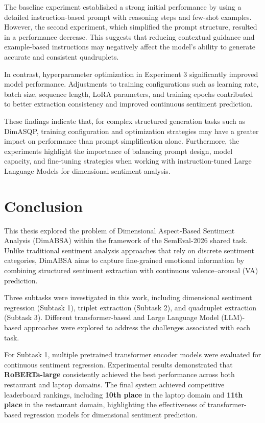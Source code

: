 \documentclass{article}
\begin{document}
The baseline experiment established a strong initial performance by using a detailed instruction-based prompt with reasoning steps and few-shot examples. However, the second experiment, which simplified the prompt structure, resulted in a performance decrease. This suggests that reducing contextual guidance and example-based instructions may negatively affect the model’s ability to generate accurate and consistent quadruplets.

In contrast, hyperparameter optimization in Experiment 3 significantly improved model performance. Adjustments to training configurations such as learning rate, batch size, sequence length, LoRA parameters, and training epochs contributed to better extraction consistency and improved continuous sentiment prediction.

These findings indicate that, for complex structured generation tasks such as DimASQP, training configuration and optimization strategies may have a greater impact on performance than prompt simplification alone. Furthermore, the experiments highlight the importance of balancing prompt design, model capacity, and fine-tuning strategies when working with instruction-tuned Large Language Models for dimensional sentiment analysis.


\section{Conclusion}
\label{sec:conclusion}

This thesis explored the problem of Dimensional Aspect-Based Sentiment Analysis (DimABSA) within the framework of the SemEval-2026 shared task. Unlike traditional sentiment analysis approaches that rely on discrete sentiment categories, DimABSA aims to capture fine-grained emotional information by combining structured sentiment extraction with continuous valence–arousal (VA) prediction.

Three subtasks were investigated in this work, including dimensional sentiment regression (Subtask 1), triplet extraction (Subtask 2), and quadruplet extraction (Subtask 3). Different transformer-based and Large Language Model (LLM)-based approaches were explored to address the challenges associated with each task.

For Subtask 1, multiple pretrained transformer encoder models were evaluated for continuous sentiment regression. Experimental results demonstrated that \textbf{RoBERTa-large} consistently achieved the best performance across both restaurant and laptop domains. The final system achieved competitive leaderboard rankings, including \textbf{10th place} in the laptop domain and \textbf{11th place} in the restaurant domain, highlighting the effectiveness of transformer-based regression models for dimensional sentiment prediction.
\end{document}
